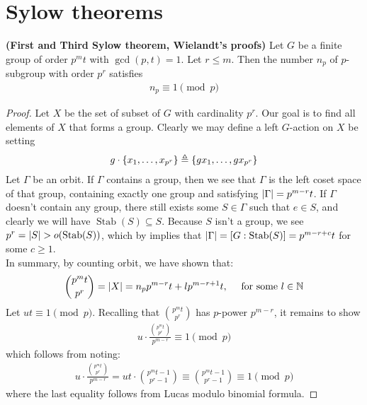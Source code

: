 \documentclass{report}
\begin{document}
\section{Sylow theorems}

\begin{theorem}
\label{THfSt}
\textbf{(First and Third Sylow theorem, Wielandt's proofs)} Let $G$ be a finite group of order $p^mt$ with $\operatorname{gcd}(p,t)=1$. Let $r\leq m$. Then the number $n_p$ of $p$-subgroup with order $p^r$ satisfies 
\begin{align*}
n_p \equiv 1 \pmod{p}
\end{align*}
\end{theorem}
\begin{proof}
Let $X$ be the set of subset of  $G$ with cardinality $p^r$. Our goal is to find all elements of $X$ that forms a group. Clearly we may define a left $G$-action on  $X$ be setting 
 \begin{align*}
g \cdot \left\{ x_1,\dots ,x_{p^r} \right\} \triangleq \left\{ gx_1,\dots ,gx_{p^r} \right\}
\end{align*}
Let $\Gamma $ be an orbit. If $\Gamma $ contains a group, then we see that $\Gamma $ is the left coset space of that group,  containing exactly one group and satisfying $\left|\Gamma \right|=p^{m-r}t$. If $\Gamma $ doesn't contain any group, there still exists some $S \in \Gamma $ such that $e \in S$, and clearly we will have $\operatorname{Stab}(S)\subseteq S$. Because $S$ isn't a group, we see  $p^r=\abso{S}>o(\operatorname{Stab}(S))$, which by  implies that $\left|\Gamma \right|= [G: \operatorname{Stab}(S)]=p^{m-r+c}t$ for some $c\geq 1$. \\

In summary, by counting orbit, we have shown that: 
\begin{align*}
\binom{p^mt}{p^r} = \left|X\right| = n_pp^{m-r}t + l p^{m-r+1}t ,\quad \text{ for some }l \in\mathbb{N}
\end{align*}
Let $ut \equiv 1 \pmod{p}$. Recalling that $\binom{p^mt}{p^r}$ has  $p$-power  $p^{m-r}$, it remains to show 
\begin{align*}
u \cdot \frac{\binom{p^mt}{p^r}}{p^{m-r}}\equiv 1 \pmod{p}
\end{align*}
which follows from noting: 
\begin{align*}
u \cdot \frac{\binom{p^mt}{p^r}}{p^{m-r}}= ut \cdot \binom{p^mt-1}{p^r-1}  \equiv\binom{p^{m}t-1}{p^{r}-1}\equiv 1 \pmod{p}
\end{align*}
where the last equality follows from Lucas modulo binomial formula.    
\end{proof}
\end{document}
